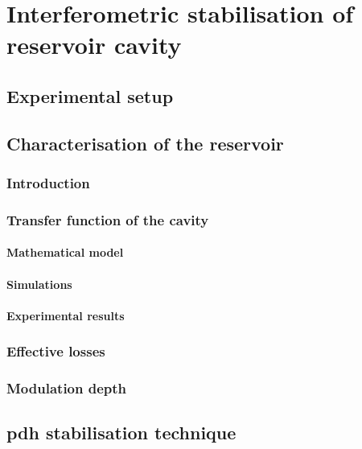 \chapter{Interferometric stabilisation of reservoir cavity}

\section{Experimental setup}


\section{Characterisation of the reservoir}

\subsection{Introduction}

\subsection{Transfer function of the cavity}

\subsubsection{Mathematical model}

\subsubsection{Simulations}

\subsubsection{Experimental results}

\subsection{Effective losses}

\subsection{Modulation depth}

\section{\acrlong{pdh} stabilisation technique}

